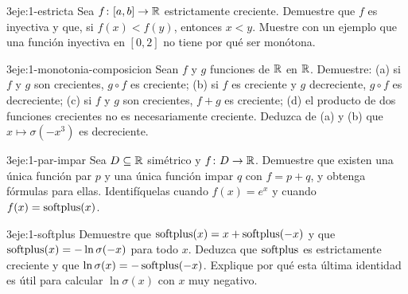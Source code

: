 \begin{ejercicio}{3}{eje:1-estricta}
Sea $f\colon[a,b]\to\mathbb{R}$ estrictamente creciente. Demuestre que $f$ es inyectiva y que, si $f(x)<f(y)$, entonces $x<y$. Muestre con un ejemplo que una función inyectiva en $[0,2]$ no tiene por qué ser monótona.
\end{ejercicio}

\begin{ejercicio}{3}{eje:1-monotonia-composicion}
Sean $f$ y $g$ funciones de $\mathbb{R}$ en $\mathbb{R}$. Demuestre: (a) si $f$ y $g$ son crecientes, $g\circ f$ es creciente; (b) si $f$ es creciente y $g$ decreciente, $g\circ f$ es decreciente; (c) si $f$ y $g$ son crecientes, $f+g$ es creciente; (d) el producto de dos funciones crecientes no es necesariamente creciente. Deduzca de (a) y (b) que $x\mapsto\sigma(-x^{3})$ es decreciente.
\end{ejercicio}

\begin{ejercicio}{3}{eje:1-par-impar}
Sea $D\subseteq\mathbb{R}$ simétrico y $f\colon D\to\mathbb{R}$. Demuestre que existen una única función par $p$ y una única función impar $q$ con $f=p+q$, y obtenga fórmulas para ellas. Identifíquelas cuando $f(x)=e^{x}$ y cuando $f(x)=\operatorname{softplus}(x)$.
\end{ejercicio}

\begin{ejercicio}{3}{eje:1-softplus}
Demuestre que $\operatorname{softplus}(x)=x+\operatorname{softplus}(-x)$ y que $\operatorname{softplus}(x)=-\ln\sigma(-x)$ para todo $x$. Deduzca que $\operatorname{softplus}$ es estrictamente creciente y que $\ln\sigma(x)=-\operatorname{softplus}(-x)$. Explique por qué esta última identidad es útil para calcular $\ln\sigma(x)$ con $x$ muy negativo.
\end{ejercicio}
